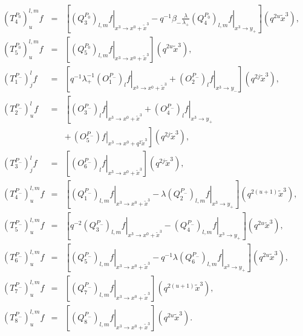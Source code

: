 \documentclass[a4paper,11pt,oneside]{article}
\begin{document}
\begin{eqnarray}
\left(T^{P_0}_4\right)^{l,m}_uf&=&
 \left[
\left. \left( Q_{3}^{P_{0}}\right) _{l,m}f\right| _{x^{3}\rightarrow x^{0}+%
\tilde{x}^{3}} 
-q^{-1}\beta_-\frac{\lambda}{\lambda_+}
\left. \left( Q_{4}^{P_{0}}\right)
_{l,m}f\right| _{x^{3}\rightarrow y_{+}}\right]\left(q^{2u}\tilde{x}^3\right),\nonumber\\
\left(T^{P_0}_5\right)^{l,m}_uf&=&
\left[ \left. \left( Q_{5}^{P_{0}}\right)
_{l,m}f\right| _{x^{3}\rightarrow x^{0}+\tilde{x}^{3}}\right] \left( q^{2u}%
\tilde{x}^{3}\right),\nonumber\\[0.16in]
\left(T^{P_-}_1\right)^l_jf&=&
\left[ q^{-1}\lambda _{+}^{-1}\left. \left(
O_{1}^{P_{-}}\right) _{l}f\right| _{x^{3}\rightarrow x^{0}+\tilde{x}%
^{3}}+\left. \left( O_{2}^{P_{-}}\right) _{l}f\right| _{x^{3}\rightarrow
y_{-}}\right] \left( q^{2j}\tilde{x}^{3}\right),\\
\left(T^{P_-}_2\right)^l_uf&=&
\left[ \left. \left( O_{3}^{P_{-}}\right) _{l}f\right|
_{x^{3}\rightarrow x^{0}+\tilde{x}^{3}}
+\left. \left( O_{4}^{P_{-}}\right)
_{l}f\right| _{x^{3}\rightarrow y_{+}} \right.\nonumber\\
&&+\,\left.\left. \left( O_{5}^{P_{-}}\right)
f\right| _{x^{3}\rightarrow x^{0}+q^{2}\tilde{x}^{3}}\right] \left( q^{2j}%
\tilde{x}^{3}\right),\nonumber\\
\left(T^{P_-}_3\right)^l_jf&=&
\left[ \left. \left( O_{6}^{P_{-}}\right)
_{l}f\right| _{x^{3}\rightarrow x^{0}+\tilde{x}^{3}}\right] \left( q^{2j}%
\tilde{x}^{3}\right),\nonumber\\
\left(T^{P_-}_4\right)^{l,m}_uf&=&
\left[ \left. \left( Q_{1}^{P_{-}}\right)
_{l,m}f\right| _{x^{3}\rightarrow x^{0}+\tilde{x}^{3}}-\lambda \left. \left(
Q_{2}^{P_{-}}\right) _{l,m}f\right| _{x^{3}\rightarrow y_{+}}\right] \left(
q^{2\left( u+1\right) }\tilde{x}^{3}\right),\nonumber\\
\left(T^{P_-}_5\right)^{l,m}_uf&=&
\left[ \left. q^{-2}\left(
Q_{3}^{P_{-}}\right) _{l,m}f\right| _{x^{3}\rightarrow x^{0}+\tilde{x}%
^{3}}
- \left. \left( Q_{4}^{P_{-}}\right)
_{l,m}f\right| _{x^{3}\rightarrow y_{+}}\right] \left( q^{2u}\tilde{x}%
^{3}\right),\nonumber\\
\left(T^{P_-}_6\right)^{l,m}_uf&=&
\left[ \left. \left( Q_{5}^{P_{-}}\right)
_{l,m}f\right| _{x^{3}\rightarrow x^{0}+\tilde{x}^{3}}-q^{-1}\lambda \left.
\left( Q_{6}^{P_{-}}\right) _{l,m}f\right| _{x^{3}\rightarrow y_{+}}\right]
\left( q^{2u}\tilde{x}^{3}\right),\nonumber\\
\left(T^{P_-}_7\right)^{l,m}_uf&=&
\left[ \left. \left( Q_{7}^{P_{-}}\right)
_{l,m}f\right| _{x^{3}\rightarrow x^{0}+\tilde{x}^{3}}\right] \left(
q^{2\left( u+1\right) }\tilde{x}^{3}\right),\nonumber\\
\left(T^{P_-}_8\right)^{l,m}_uf&=&
 \left[ \left. \left(
Q_{8}^{P_{-}}\right) _{l,m}f\right| _{x^{3}\rightarrow x^{0}+\tilde{x}%
^{3}}\right] \left( q^{2u}\tilde{x}^{3}\right).\nonumber
\end{eqnarray}
\end{document}
